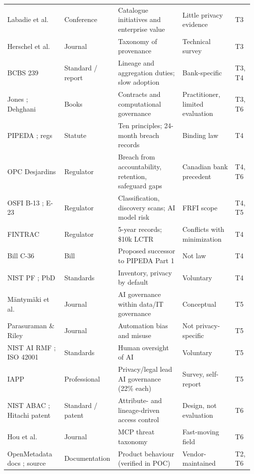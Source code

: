 \documentclass[journal,onecolumn,11pt]{IEEEtran}
\begin{document}
{\begin{longtable}{L{2.3cm} L{1.7cm} L{4.4cm} L{4.6cm} L{0.8cm}}
Labadie et al.\ \cite{labadie} & Conference & Catalogue initiatives and enterprise value & Little privacy evidence & T3 \\
Herschel et al.\ \cite{herschel} & Journal & Taxonomy of provenance & Technical survey & T3 \\
BCBS 239 \cite{bcbs239,bcbs_progress} & Standard / report & Lineage and aggregation duties; slow adoption & Bank-specific & T3, T4 \\
Jones \cite{jones_contracts}; Dehghani \cite{dehghani} & Books & Contracts and computational governance & Practitioner, limited evaluation & T3, T6 \\
PIPEDA \cite{pipeda}; regs \cite{breachregs} & Statute & Ten principles; 24-month breach records & Binding law & T4 \\
OPC Desjardins \cite{opc_desjardins} & Regulator & Breach from accountability, retention, safeguard gaps & Canadian bank precedent & T4, T6 \\
OSFI B-13 \cite{osfi_b13}; E-23 \cite{osfi_e23} & Regulator & Classification, discovery scans; AI model risk & FRFI scope & T4, T5 \\
FINTRAC \cite{fintrac_records,fintrac_lctr} & Regulator & 5-year records; \$10k LCTR & Conflicts with minimization & T4 \\
Bill C-36 \cite{billc36} & Bill & Proposed successor to PIPEDA Part 1 & Not law & T4 \\
NIST PF \cite{nist_pf}; PbD \cite{cavoukian} & Standards & Inventory, privacy by default & Voluntary & T4 \\
Mäntymäki et al.\ \cite{mantymaki} & Journal & AI governance within data/IT governance & Conceptual & T5 \\
Parasuraman \& Riley \cite{parasuraman} & Journal & Automation bias and misuse & Not privacy-specific & T5 \\
NIST AI RMF \cite{nist_airmf}; ISO 42001 \cite{iso42001} & Standards & Human oversight of AI & Voluntary & T5 \\
IAPP \cite{iapp_ai} & Professional & Privacy/legal lead AI governance (22\% each) & Survey, self-report & T5 \\
NIST ABAC \cite{nist800162}; Hitachi patent \cite{pat_hitachi} & Standard / patent & Attribute- and lineage-driven access control & Design, not evaluation & T6 \\
Hou et al.\ \cite{hou_mcp} & Journal & MCP threat taxonomy & Fast-moving field & T6 \\
OpenMetadata docs \cite{om_autoclass,om_policies,om_contracts,om_mcp}; source \cite{om_source} & Documentation & Product behaviour (verified in POC) & Vendor-maintained & T2, T6 \\
\bottomrule
\end{longtable}
}
\end{document}
